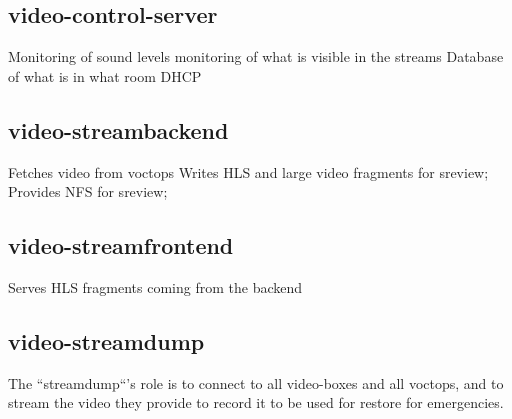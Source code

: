 \documentclass{article}
\begin{document}
\subsection{video-control-server}

Monitoring of sound levels
monitoring of what is visible in the streams
Database of what is in what room
DHCP

\subsection{video-streambackend}

Fetches video from voctops
Writes HLS and large video fragments for sreview;
Provides NFS for sreview;

\subsection{video-streamfrontend}

Serves HLS fragments coming from the backend

\subsection{video-streamdump}

The ``streamdump``'s role is to connect to all video-boxes and all voctops, and to stream the video they provide to record it to be used for restore for emergencies.
\end{document}
